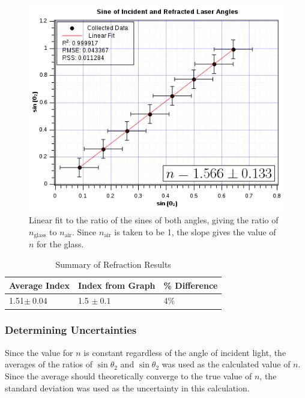 \documentclass[twocolumn,english]{IEEEtran}
\theoremstyle{plain}
\theoremstyle{plain}
\begin{document}
\begin{centering}
\begin{figure}[!H]
	\begin{centering}
	\begin{center}
	\includegraphics[width=\linewidth]{./graph.png}
	\caption{Linear fit to the ratio of the sines of both angles, giving the ratio of $n_{\text{glass}}$ to $n_{\text{air}}$. Since $n_{\text{air}}$ is taken to be 1, the slope gives the value of $n$ for the glass. }
	\label{fig:graph}
	\end{center}
	\par\end{centering}
\end{figure}

\begin{table}[!H]
\centering{}
\caption{Summary of Refraction Results}
\begin{tabular}{@{}lll@{}}
\toprule
\textbf{Average Index} 		& \textbf{Index from Graph} 	& \textbf{\% Difference} \\ \midrule
1.51$\pm~0.04$           	& 1.5 $\pm~0.1$					& 4\%                      \\ \bottomrule
\end{tabular}
\end{table}
\end{centering}

\subsubsection{Determining Uncertainties}

Since the value for $n$ is constant regardless of the angle of incident light, the averages of the ratios of $\sin\theta_2$ and $\sin\theta_2$ was used as the calculated value of $n$. Since the average should theoretically converge to the true value of $n$, the standard deviation was used as the uncertainty in this calculation.
\end{document}
